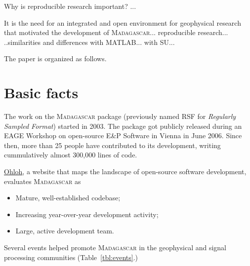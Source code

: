 Why is reproducible research important? ...

It is the need for an integrated and open environment for geophysical
research that motivated the development of
\textsc{Madagascar}... reproducible research... ..similarities and
differences with MATLAB... with SU...

The paper is organized as follows. 


\section{Basic facts}

The work on the \textsc{Madagascar} package (previously named RSF for
\emph{Regularly Sampled Format}) started in 2003.  The package got
publicly released during an EAGE Workshop on open-source E\&P Software
in Vienna in June 2006. Since then, more than 25 people have
contributed to its development, writing cummulatively almost
300,000 lines of code.

\href{http://www.ohloh.net/}{Ohloh}, a website that maps the landscape
of open-source software development, evaluates \textsc{Madagascar} as
\begin{itemize}
\item Mature, well-established codebase;
\item Increasing year-over-year development activity;
\item Large, active development team.
\end{itemize}

Several events helped promote \textsc{Madagascar} in the geophysical
and signal processing communities (Table~\ref{tbl:events}.)



